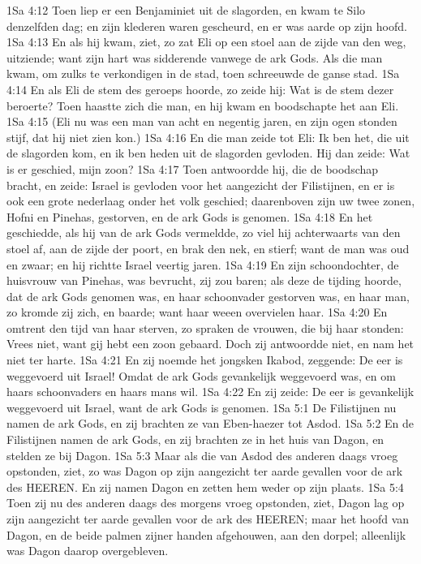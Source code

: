 1Sa 4:12  Toen liep er een Benjaminiet uit de slagorden, en kwam te Silo denzelfden dag; en zijn klederen waren gescheurd, en er was aarde op zijn hoofd.
1Sa 4:13  En als hij kwam, ziet, zo zat Eli op een stoel aan de zijde van den weg, uitziende; want zijn hart was sidderende vanwege de ark Gods. Als die man kwam, om zulks te verkondigen in de stad, toen schreeuwde de ganse stad.
1Sa 4:14  En als Eli de stem des geroeps hoorde, zo zeide hij: Wat is de stem dezer beroerte? Toen haastte zich die man, en hij kwam en boodschapte het aan Eli.
1Sa 4:15  (Eli nu was een man van acht en negentig jaren, en zijn ogen stonden stijf, dat hij niet zien kon.)
1Sa 4:16  En die man zeide tot Eli: Ik ben het, die uit de slagorden kom, en ik ben heden uit de slagorden gevloden. Hij dan zeide: Wat is er geschied, mijn zoon?
1Sa 4:17  Toen antwoordde hij, die de boodschap bracht, en zeide: Israel is gevloden voor het aangezicht der Filistijnen, en er is ook een grote nederlaag onder het volk geschied; daarenboven zijn uw twee zonen, Hofni en Pinehas, gestorven, en de ark Gods is genomen.
1Sa 4:18  En het geschiedde, als hij van de ark Gods vermeldde, zo viel hij achterwaarts van den stoel af, aan de zijde der poort, en brak den nek, en stierf; want de man was oud en zwaar; en hij richtte Israel veertig jaren.
1Sa 4:19  En zijn schoondochter, de huisvrouw van Pinehas, was bevrucht, zij zou baren; als deze de tijding hoorde, dat de ark Gods genomen was, en haar schoonvader gestorven was, en haar man, zo kromde zij zich, en baarde; want haar weeen overvielen haar.
1Sa 4:20  En omtrent den tijd van haar sterven, zo spraken de vrouwen, die bij haar stonden: Vrees niet, want gij hebt een zoon gebaard. Doch zij antwoordde niet, en nam het niet ter harte.
1Sa 4:21  En zij noemde het jongsken Ikabod, zeggende: De eer is weggevoerd uit Israel! Omdat de ark Gods gevankelijk weggevoerd was, en om haars schoonvaders en haars mans wil.
1Sa 4:22  En zij zeide: De eer is gevankelijk weggevoerd uit Israel, want de ark Gods is genomen.
1Sa 5:1  De Filistijnen nu namen de ark Gods, en zij brachten ze van Eben-haezer tot Asdod.
1Sa 5:2  En de Filistijnen namen de ark Gods, en zij brachten ze in het huis van Dagon, en stelden ze bij Dagon.
1Sa 5:3  Maar als die van Asdod des anderen daags vroeg opstonden, ziet, zo was Dagon op zijn aangezicht ter aarde gevallen voor de ark des HEEREN. En zij namen Dagon en zetten hem weder op zijn plaats.
1Sa 5:4  Toen zij nu des anderen daags des morgens vroeg opstonden, ziet, Dagon lag op zijn aangezicht ter aarde gevallen voor de ark des HEEREN; maar het hoofd van Dagon, en de beide palmen zijner handen afgehouwen, aan den dorpel; alleenlijk was Dagon daarop overgebleven.
